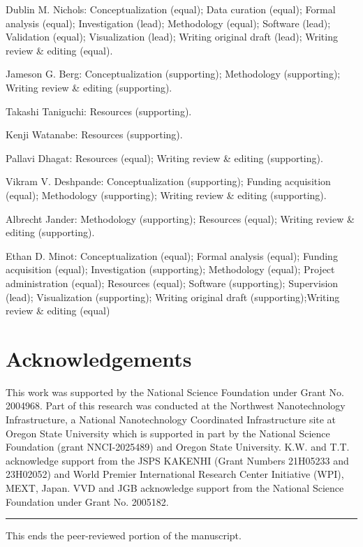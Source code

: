\documentclass[double,12pt,1in,seploa]{beavtex}
\let\Oldsection\section
\renewcommand{\section}{\FloatBarrier\Oldsection}
\begin{document}
Dublin M. Nichols: Conceptualization (equal); Data curation (equal); Formal analysis (equal); Investigation (lead); Methodology (equal); Software (lead); Validation (equal); Visualization (lead); Writing \textemdash original draft (lead); Writing \textemdash review \& editing (equal). 

\noindent
Jameson G. Berg: Conceptualization (supporting); Methodology (supporting); Writing \textemdash review \& editing (supporting). 

\noindent
Takashi Taniguchi: Resources (supporting). 

\noindent
Kenji Watanabe: Resources (supporting). 

\noindent
Pallavi Dhagat: Resources (equal); Writing \textemdash review \& editing (supporting). 

\noindent
Vikram V. Deshpande: Conceptualization (supporting); Funding acquisition (equal); Methodology (supporting); Writing \textemdash review \& editing (supporting). 

\noindent
Albrecht Jander: Methodology (supporting); Resources (equal); Writing \textemdash review \& editing (supporting). 

\noindent
Ethan D. Minot: Conceptualization (equal); Formal analysis (equal); Funding acquisition (equal); Investigation (supporting); Methodology (equal); Project administration (equal); Resources (equal); Software (supporting); Supervision (lead); Visualization (supporting); Writing \textemdash original draft (supporting);Writing \textemdash review \& editing (equal)

\section{Acknowledgements}
This work was supported by the National Science Foundation under Grant No. 2004968. Part of this research was conducted at the Northwest Nanotechnology Infrastructure, a National Nanotechnology Coordinated Infrastructure site at Oregon State University which is supported in part by the National Science Foundation (grant NNCI-2025489) and Oregon State University.
K.W. and T.T. acknowledge support from the JSPS KAKENHI (Grant Numbers 21H05233 and 23H02052) and World Premier International Research Center Initiative (WPI), MEXT, Japan. 
VVD and JGB acknowledge support from the National Science Foundation under Grant No. 2005182.

\noindent\rule{\textwidth}{1pt}

\begin{center}
    This ends the peer-reviewed portion of the manuscript.
\end{center}
\end{document}
